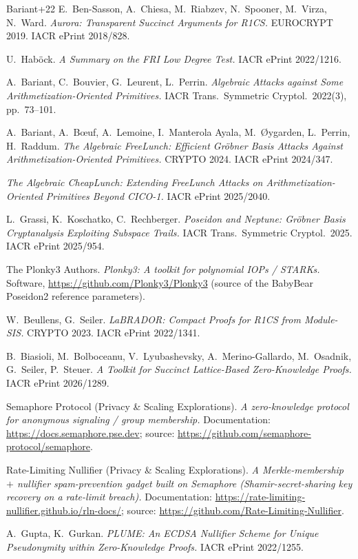 \documentclass[11pt]{article}
\theoremstyle{plain}
\theoremstyle{definition}
\begin{document}
\begin{thebibliography}{Bariant+22}
 E.~Ben-Sasson, A.~Chiesa, M.~Riabzev, N.~Spooner, M.~Virza, N.~Ward.
  \emph{Aurora: Transparent Succinct Arguments for R1CS.} EUROCRYPT 2019. IACR ePrint 2018/828.

 U.~Hab\"ock. \emph{A Summary on the FRI Low Degree Test.} IACR ePrint
  2022/1216.

 A.~Bariant, C.~Bouvier, G.~Leurent, L.~Perrin. \emph{Algebraic
  Attacks against Some Arithmetization-Oriented Primitives.} IACR Trans.\ Symmetric Cryptol.\
  2022(3), pp.~73--101.

 A.~Bariant, A.~B\oe uf, A.~Lemoine, I.~Manterola Ayala, M.~\O ygarden,
  L.~Perrin, H.~Raddum. \emph{The Algebraic FreeLunch: Efficient Gr\"obner Basis Attacks Against
  Arithmetization-Oriented Primitives.} CRYPTO 2024. IACR ePrint 2024/347.

 \emph{The Algebraic CheapLunch: Extending FreeLunch Attacks on
  Arithmetization-Oriented Primitives Beyond CICO-1.} IACR ePrint 2025/2040.

 L.~Grassi, K.~Koschatko, C.~Rechberger. \emph{Poseidon and Neptune: Gr\"obner
  Basis Cryptanalysis Exploiting Subspace Trails.} IACR Trans.\ Symmetric Cryptol.\ 2025. IACR ePrint
  2025/954.

 The Plonky3 Authors. \emph{Plonky3: A toolkit for polynomial IOPs /
  STARKs.} Software, \url{https://github.com/Plonky3/Plonky3} (source of the BabyBear Poseidon2
  reference parameters).

 W.~Beullens, G.~Seiler. \emph{LaBRADOR: Compact Proofs for R1CS from
  Module-SIS.} CRYPTO 2023. IACR ePrint 2022/1341.

 B.~Biasioli, M.~Bolboceanu, V.~Lyubashevsky, A.~Merino-Gallardo, M.~Osadnik,
  G.~Seiler, P.~Steuer. \emph{A Toolkit for Succinct Lattice-Based Zero-Knowledge Proofs.} IACR
  ePrint 2026/1289.

 Semaphore Protocol (Privacy \& Scaling Explorations). \emph{A zero-knowledge
  protocol for anonymous signaling / group membership.} Documentation:
  \url{https://docs.semaphore.pse.dev}; source: \url{https://github.com/semaphore-protocol/semaphore}.

 Rate-Limiting Nullifier (Privacy \& Scaling Explorations). \emph{A
  Merkle-membership $+$ nullifier spam-prevention gadget built on Semaphore (Shamir-secret-sharing key
  recovery on a rate-limit breach).} Documentation:
  \url{https://rate-limiting-nullifier.github.io/rln-docs/}; source:
  \url{https://github.com/Rate-Limiting-Nullifier}.

 A.~Gupta, K.~Gurkan. \emph{PLUME: An ECDSA Nullifier Scheme for Unique
  Pseudonymity within Zero-Knowledge Proofs.} IACR ePrint 2022/1255.

\end{thebibliography}
\end{document}
